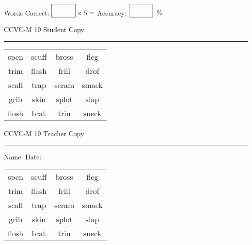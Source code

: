 \documentclass{memoir}
\begin{document}
\small

Words Correct: $\fbox{\phantom{\huge 100}} \times 5 = $ Accuracy: $\fbox{\phantom{\huge 100}}\;\; \%$ 

\vfill

\newpage


\footnotesize \noindent
CCVC-M 19 \hfill Student Copy
\smallskip
\hrule

\Large

\setlength{\tabcolsep}{14pt}
\def\arraystretch{3}

{\selectfont


\begin{vplace}[0.5]
\begin{center}
\begin{tabular}{cccc}
spen & scuff & bross       & fleg             \\
trim & flash             & frill & drof \\
scall & trap & scram & smack \\
grib                    & skin & splot & slap            \\
flosh & brat               & trin & sneck \\
\end{tabular}
\end{center}
\end{vplace}

}

\newpage

\footnotesize \noindent
CCVC-M 19 \hfill Teacher Copy
\smallskip
\hrule

\small

\vfill

\noindent
Name: \underline{\hspace{1.75in}} \hfill Date: \underline{\hspace{1in}}

\Large

{\selectfont


\begin{vplace}[0.5]
\begin{center}
\begin{tabular}{cccc}
spen & scuff & bross       & fleg             \\
trim & flash             & frill & drof \\
scall & trap & scram & smack \\
grib                    & skin & splot & slap            \\
flosh & brat               & trin & sneck \\
\end{tabular}
\end{center}
\end{vplace}



}
\end{document}
